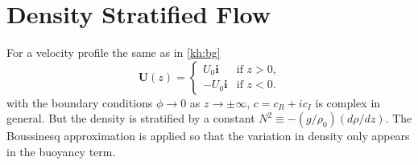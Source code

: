 \section{Density Stratified Flow}
For a velocity profile the same as in \eqref{kh:bg}
\begin{equation*}
\mathbf{U}(z) =
\begin{cases} U_0 \mathbf{i} &\text{if $z>0$,}\\
-U_0 \mathbf{i} &\text{if $z<0$.}
\end{cases}
\end{equation*}
with the boundary conditions $\phi \to 0$ as $z \to \pm\infty$,
$c=c_R+ic_I$ is complex in general. But the density is stratified by
a constant $N^2\equiv-(g/\rho_0)(d\rho/dz)$. The Boussinesq
approximation is applied so that the variation in density only
appears in the buoyancy term.

